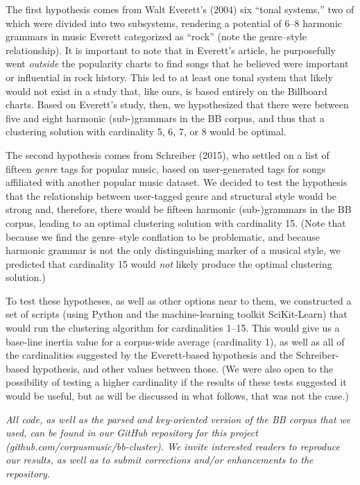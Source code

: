 The first hypothesis comes from Walt Everett's (2004) six ``tonal systems,'' two of which were divided into two subsystems, rendering a potential of 6–8 harmonic grammars in music Everett categorized as ``rock'' (note the genre–style relationship). It is important to note that in Everett's article, he purposefully went \emph{outside} the popularity charts to find songs that he believed were important or influential in rock history. This led to at least one tonal system that likely would not exist in a study that, like ours, is based entirely on the Billboard charts. Based on Everett's study, then, we hypothesized that there were between five and eight harmonic (sub-)grammars in the BB corpus, and thus that a clustering solution with cardinality 5, 6, 7, or 8 would be optimal.

The second hypothesis comes from Schreiber (2015), who settled on a list of fifteen \emph{genre} tags for popular music, based on user-generated tags for songs affiliated with another popular music dataset. We decided to test the hypothesis that the relationship between user-tagged genre and structural style would be strong and, therefore, there would be fifteen harmonic (sub-)grammars in the BB corpus, leading to an optimal clustering solution with cardinality 15. (Note that because we find the genre–style conflation to be problematic, and because harmonic grammar is not the only distinguishing marker of a musical style, we predicted that cardinality 15 would \emph{not} likely produce the optimal clustering solution.)

To test these hypotheses, as well as other options near to them, we constructed a set of scripts (using Python and the machine-learning toolkit SciKit-Learn) that would run the clustering algorithm for cardinalities 1–15. This would give us a base-line inertia value for a corpus-wide average (cardinality 1), as well as all of the cardinalities suggested by the Everett-based hypothesis and the Schreiber-based hypothesis, and other values between those. (We were also open to the possibility of testing a higher cardinality if the results of these tests suggested it would be useful, but as will be discussed in what follows, that was not the case.)

\emph{All code, as well as the parsed and key-oriented version of the BB corpus that we used, can be found in our GitHub repository for this project (github.com\slash corpusmusic\slash bb-cluster). We invite interested readers to reproduce our results, as well as to submit corrections and\slash or enhancements to the repository.}

